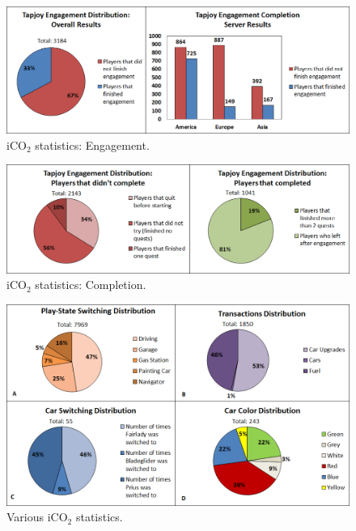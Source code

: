 \documentclass[preprint,authoryear,12pt]{elsarticle}
\begin{document}
\begin{figure}[htb]
	\begin{center}
		\includegraphics[width=.95\linewidth]{ijhcs14-img/engagement}
		\caption{iCO$_2$ statistics: Engagement.\label{fig:engagement}}
	\end{center}
\end{figure}

\begin{figure}[htb]
	\begin{center}
		\includegraphics[width=.95\linewidth]{ijhcs14-img/completion}
		\caption{iCO$_2$ statistics: Completion.\label{fig:completion}}
	\end{center}
\end{figure}


\begin{figure}[htb]
	\begin{center}
		\includegraphics[width=.95\linewidth]{ijhcs14-img/4diagrams2}
		\caption{Various iCO$_2$ statistics.\label{fig:4diagrams}}
	\end{center}
\end{figure}
\end{document}
